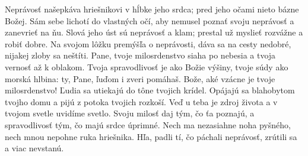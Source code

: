Neprávosť našepkáva hriešnikovi v hĺbke jeho srdca;
pred jeho očami nieto bázne Božej.
\versseparator
Sám sebe lichotí do vlastných očí,
aby nemusel poznať svoju neprávosť a zanevrieť na ňu.
Slová jeho úst sú neprávosť a klam;
prestal už myslieť rozvážne a robiť dobre.
Na svojom lôžku premýšľa o neprávosti,
dáva sa na cesty nedobré,
nijakej zloby sa neštíti.
\versseparator
Pane, tvoje milosrdenstvo siaha po nebesia
a tvoja vernosť až k oblakom.
Tvoja spravodlivosť je ako Božie výšiny,
tvoje súdy ako morská hlbina:
ty, Pane, ľuďom i zveri pomáhaš.
\versseparator
Bože, aké vzácne je tvoje milosrdenstvo!
Ľudia sa utiekajú do tône tvojich krídel.
Opájajú sa blahobytom tvojho domu
a pijú z potoka tvojich rozkoší.
Veď u teba je zdroj života
a v tvojom svetle uvidíme svetlo.
\versseparator
Svoju milosť daj tým, čo ťa poznajú,
a spravodlivosť tým, čo majú srdce úprimné.
Nech ma nezasiahne noha pyšného,
nech mnou nepohne ruka hriešnika.
Hľa, padli tí, čo páchali neprávosť,
zrútili sa a viac nevstanú. 
